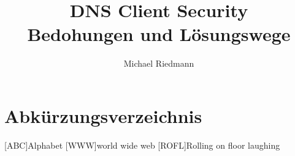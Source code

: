 \documentclass[Bachelor, BIC, german]{twbook}
\title{DNS Client Security\\Bedohungen und Lösungswege}
\author{Michael Riedmann}
\begin{document}
\maketitle

\listoftodos























 

\clearpage

\listoffigures
\clearpage

\listoftables
\clearpage

\lstlistoflistings
\clearpage

{}
\chapter*{Abkürzungsverzeichnis}
\begin{acronym}[XXXXX]
    [ABC]{Alphabet}
    [WWW]{world wide web}
    [ROFL]{Rolling on floor laughing}
\end{acronym}


\end{document}
